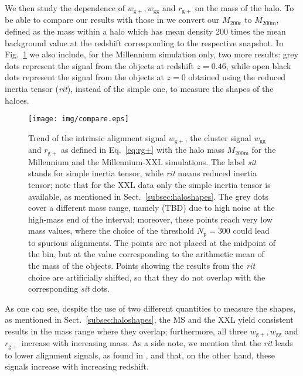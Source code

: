 \documentclass[a4paper,fleqn,usenatbib]{mnras}
\begin{document}
We then study the dependence of $w_{\mathrm{g+}}, w_{\mathrm{gg}}$ and $r_{\mathrm{g+}}$ on the mass of the halo. To be able to compare our results with those in \citet[figure 7]{vanUitertJoachimi2017} we convert our $M_{\mathrm{200c}}$ to $M_{\mathrm{200m}}$, defined as the mass within a halo which has mean density 200 times the mean background value at the redshift corresponding to the respective snapshot. In Fig.~\ref{fig:vsmass} we also include, for the Millennium simulation only, two more results: grey dots represent the signal from the objects at redshift $z = 0.46$, while open black dots represent the signal from the objects at $z = 0$ obtained using the reduced inertia tensor (\textit{rit}), instead of the simple one, to measure the shapes of the haloes.
\begin{figure}
	\centerline{
	\texttt{[image: img/compare.eps]}}
	\caption{Trend of the intrinsic alignment signal $w_{\mathrm{g+}}$, the cluster signal $w_{\mathrm{gg}}$ and $r_{\mathrm{g+}}$ as defined in Eq.~\ref{eq:rg+} with the halo mass $M_{\mathrm{200m}}$ for the Millennium and the Millennium-XXL simulations. The label \textit{sit} stands for simple inertia tensor, while \textit{rit} means reduced inertia tensor; note that for the XXL data only the simple inertia tensor is available, as mentioned in Sect.~\ref{subsec:haloshapes}. The grey dots cover a different mass range, namely (TBD) 
	due to high noise at the high-mass end of the interval; moreover, these points reach very low mass values, where the choice of the threshold $N_{\mathrm{p}}=300$ could lead to spurious alignments. The points are not placed at the midpoint of the bin, but at the value corresponding to the arithmetic mean of the mass of the objects. 
	Points showing the results from the \textit{rit} choice are artificially shifted, so that they do not overlap with the corresponding \textit{sit} dots.}
	\label{fig:vsmass}
\end{figure}
As one can see, despite the use of two different quantities to measure the shapes, as mentioned in Sect.~\ref{subsec:haloshapes}, the MS and the XXL yield consistent results in the mass range where they overlap; furthermore, all three $w_{\mathrm{g+}}, w_{\mathrm{gg}}$ and $r_{\mathrm{g+}}$ increase with increasing mass. As a side note, we mention that the \textit{rit} leads to lower alignment signals, as found in \citet{Joachimietal2013b}, and that, on the other hand, these signals increase with increasing redshift.
\end{document}
